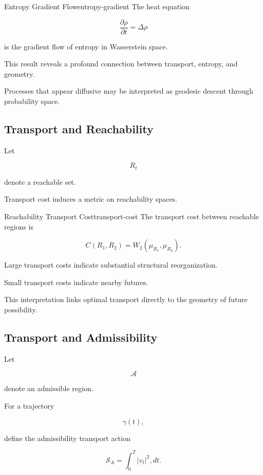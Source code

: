 \documentclass[12pt,twoside,openright]{book}
\begin{document}
\begin{theorem}{Entropy Gradient Flow}{entropy-gradient}
The heat equation

\[
\frac{\partial\rho}{\partial t}
=

\Delta\rho
\]

is the gradient flow of entropy in Wasserstein space.
\end{theorem}

This result reveals a profound connection between
transport, entropy, and geometry.

Processes that appear diffusive may be interpreted as
geodesic descent through probability space.

\subsection{Transport and Reachability}

Let

\[
R_t
\]

denote a reachable set.

Transport cost induces a metric on reachability spaces.

\begin{definition}{Reachability Transport Cost}{transport-cost}
The transport cost between reachable regions is

\[
C(R_1,R_2)
=

W_2(\mu_{R_1},\mu_{R_2}).
\]
\end{definition}

Large transport costs indicate substantial structural
reorganization.

Small transport costs indicate nearby futures.

This interpretation links optimal transport directly to
the geometry of future possibility.

\subsection{Transport and Admissibility}

Let

\[
\mathcal A
\]

denote an admissible region.

For a trajectory

\[
\gamma(t),
\]

define the admissibility transport action

\[
\mathcal S_A
=

\int_0^T
|v_t|^2
,dt.
\]
\end{document}
